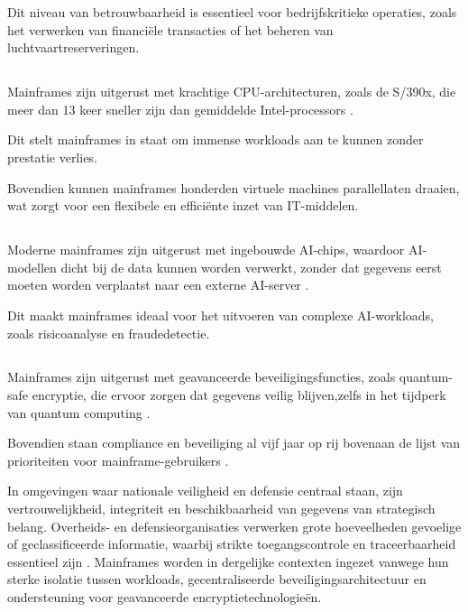 Dit niveau van betrouwbaarheid is essentieel voor bedrijfskritieke operaties, zoals het verwerken van financiële transacties of het beheren van luchtvaartreserveringen.

\subsection{}
\label{sec:verwerkingskracht}
Mainframes zijn uitgerust met krachtige CPU-architecturen, zoals de S/390x, die meer dan 13 keer sneller zijn dan gemiddelde Intel-processors \autocite{IBMMainframe}. 

Dit stelt mainframes in staat om immense workloads aan te kunnen zonder prestatie verlies. 

Bovendien kunnen mainframes honderden virtuele machines parallellaten draaien, wat zorgt voor een flexibele en efficiënte inzet van IT-middelen.

\subsection{}
\label{sec:ai-capaciteit}
Moderne mainframes zijn uitgerust met ingebouwde AI-chips, waardoor AI-modellen dicht bij de data kunnen worden verwerkt, zonder dat gegevens eerst moeten worden verplaatst naar een externe AI-server \autocite{IBMMainframe}. 

Dit maakt mainframes ideaal voor het uitvoeren van complexe AI-workloads, zoals risicoanalyse en fraudedetectie.

\subsection{}
\label{sec:beveiliging-militaire-context}
Mainframes zijn uitgerust met geavanceerde beveiligingsfuncties, zoals quantum-safe encryptie, die ervoor zorgen dat gegevens veilig blijven,zelfs in het tijdperk van quantum computing \autocite{IBMMainframe}. 

Bovendien staan compliance en beveiliging al vijf jaar op rij bovenaan de lijst van prioriteiten voor mainframe-gebruikers \autocite{BMC2024}.

In omgevingen waar nationale veiligheid en defensie centraal staan, zijn vertrouwelijkheid, integriteit en beschikbaarheid van gegevens van strategisch belang. Overheids- en defensieorganisaties verwerken grote hoeveelheden gevoelige of geclassificeerde informatie, waarbij strikte toegangscontrole en traceerbaarheid essentieel zijn \autocite{IBM_zOS_Security}. Mainframes worden in dergelijke contexten ingezet vanwege hun sterke isolatie tussen workloads, gecentraliseerde beveiligingsarchitectuur en ondersteuning voor geavanceerde encryptietechnologieën. 

